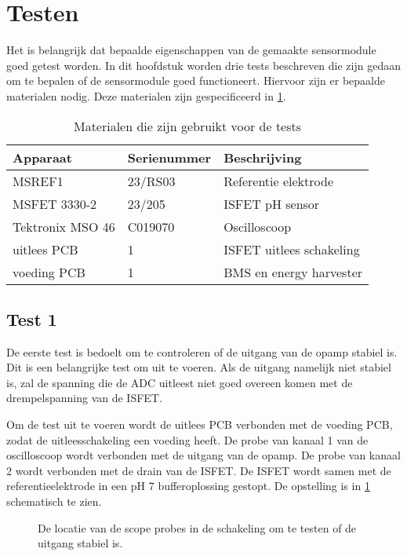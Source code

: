 \section{Testen}
Het is belangrijk dat bepaalde eigenschappen van de gemaakte sensormodule goed getest worden. In dit hoofdstuk worden drie tests beschreven die zijn gedaan om te bepalen of de sensormodule goed functioneert. Hiervoor zijn er bepaalde materialen nodig. Deze materialen zijn gespecificeerd in \cref{tab:testMaterialen}.
\begin{table}[ht]
    \centering
    \begin{tabular}{l|l|l}
        Apparaat         & Serienummer & Beschrijving \\
        \hline
        MSREF1           & 23/RS03     & Referentie elektrode       \\
        MSFET 3330-2     & 23/205      & ISFET pH sensor            \\
        Tektronix MSO 46 & C019070     & Oscilloscoop               \\
        uitlees PCB      & 1           & ISFET uitlees schakeling   \\
        voeding PCB      & 1           & BMS en energy harvester    \\    
        \hline
    \end{tabular}
    \caption{Materialen die zijn gebruikt voor de tests}
    \label{tab:testMaterialen}
\end{table}

\subsection{Test 1}
De eerste test is bedoelt om te controleren of de uitgang van de opamp stabiel is. Dit is een belangrijke test om uit te voeren. Als de uitgang namelijk niet stabiel is, zal de spanning die de ADC uitleest niet goed overeen komen met de drempelspanning van de ISFET.

Om de test uit te voeren wordt de uitlees PCB verbonden met de voeding PCB, zodat de uitleesschakeling een voeding heeft. De probe van kanaal 1 van de oscilloscoop wordt verbonden met de uitgang van de opamp. De probe van kanaal 2 wordt verbonden met de drain van de ISFET. De ISFET wordt samen met de referentieelektrode in een pH 7 bufferoplossing gestopt. De opstelling is in \cref{fig:test ISFET circuit best} schematisch te zien.

\begin{figure}[ht]
    \centering
    \def\svgwidth{0.75\textwidth}
    
    \caption{De locatie van de scope probes in de schakeling om te testen of de uitgang stabiel is.}
    \label{fig:test ISFET circuit best}
\end{figure}


